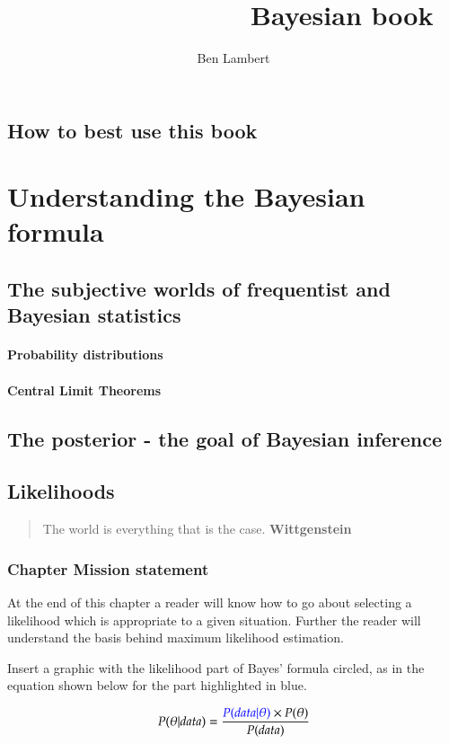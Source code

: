 \documentclass[11pt,fullpage]{book}
\title{\textbf{~~~~~~~~~~~~~~~}\newline Bayesian book}
\author{Ben Lambert}
\begin{document}
\tableofcontents
\chapter{How to best use this book}
\part{Understanding the Bayesian formula}
\chapter{The subjective worlds of frequentist and Bayesian statistics}
\subsection{Probability distributions}\label{sec:Intro_probabilityDistributions}
\subsection{Central Limit Theorems}\label{sec:Intro_CLT}

\chapter{The posterior - the goal of Bayesian inference}

\chapter{Likelihoods}\label{chap:Likelihoods}
\begin{quotation}
The world is everything that is the case. \textbf{Wittgenstein}
\end{quotation}

\section{Chapter Mission statement}
At the end of this chapter a reader will know how to go about selecting a likelihood which is appropriate to a given situation. Further the reader will understand the basis behind maximum likelihood estimation.

Insert a graphic with the likelihood part of Bayes' formula circled, as in the equation shown below for the part highlighted in blue.

\begin{equation}
P(\theta|data) = \frac{{\color{blue}P(data|\theta)}\times P(\theta)}{P(data)}
\end{equation}\label{eq:Likelihood_BayesHighlighted}
\end{document}

